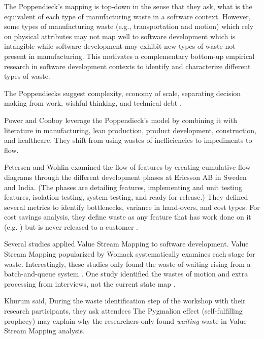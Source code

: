 The Poppendieck's mapping is top-down in the sense that they ask, what is the equivalent of each type of manufacturing waste in a software context. However, some types of manufacturing waste (e.g., transportation and motion) which rely on physical attributes may not map well to software development which is intangible while software development may exhibit new types of waste not present in manufacturing. This motivates a complementary bottom-up empirical research in software development contexts to identify and characterize different types of waste. 

The Poppendiecks suggest  complexity, economy of scale, separating decision making from work, wishful thinking, and technical debt \cite{PoppendieckResultsNotPoint}.

Power and Conboy leverage the Poppendieck's model by combining it with literature in manufacturing, lean production, product development, construction, and healthcare. They shift from using wastes of inefficiencies to impediments to flow. \cite{PowerImpediments}

Petersen and Wohlin examined the flow of features by creating cumulative flow diagrams through the different development phases at Ericsson AB in Sweden and India. (The phases are detailing features, implementing and unit testing features, isolation testing, system testing, and ready for release.) They defined several metrics to identify bottlenecks, variance in hand-overs, and cost types. For cost savings analysis, they define waste as any feature that has work done on it (e.g. ) but is never released to a customer \cite{Petersen2011}.

Several studies applied Value Stream Mapping to software development. Value Stream Mapping popularized by Womack systematically examines each stage for waste. Interestingly, these studies only found the waste of waiting rising from a batch-and-queue system \cite{Ali2016, Khurum2014, Mujtaba2010}. One study identified the wastes of motion and extra processing from interviews, not the current state map \cite{Mujtaba2010}.

Khurum said,  During the waste identification step of the workshop with their research participants, they ask attendees  \cite{Khurum2014} The Pygmalion effect (self-fulfilling prophecy) may explain why the researchers only found \textit{waiting} waste in Value Stream Mapping analysis.

